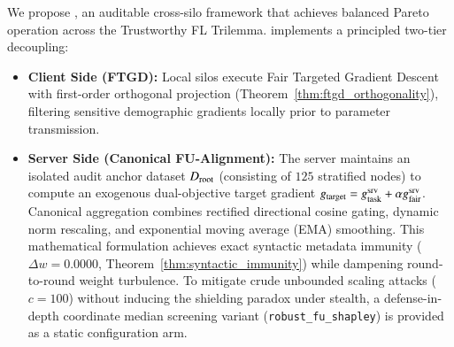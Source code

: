 We propose \MethodName{}, an auditable cross-silo framework that achieves balanced Pareto operation across the Trustworthy FL Trilemma. \MethodName{} implements a principled two-tier decoupling:
\begin{itemize}[leftmargin=*]
    \item \textbf{Client Side (FTGD):} Local silos execute Fair Targeted Gradient Descent with first-order orthogonal projection (Theorem~\ref{thm:ftgd_orthogonality}), filtering sensitive demographic gradients locally prior to parameter transmission.
    \item \textbf{Server Side (Canonical FU-Alignment):} The server maintains an isolated audit anchor dataset $D_{\mathrm{root}}$ (consisting of $125$ stratified nodes) to compute an exogenous dual-objective target gradient $g_{\mathrm{target}} = g_{\mathrm{task}}^{\mathrm{srv}} + \alpha g_{\mathrm{fair}}^{\mathrm{srv}}$. Canonical aggregation combines rectified directional cosine gating, dynamic norm rescaling, and exponential moving average (EMA) smoothing. This mathematical formulation achieves exact syntactic metadata immunity ($\Delta w = 0.0000$, Theorem~\ref{thm:syntactic_immunity}) while dampening round-to-round weight turbulence. To mitigate crude unbounded scaling attacks ($c = 100$) without inducing the shielding paradox under stealth, a defense-in-depth coordinate median screening variant (\texttt{robust\_fu\_shapley}) is provided as a static configuration arm.
\end{itemize}

